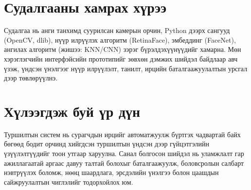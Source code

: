 \section{Судалгааны хамрах хүрээ}
Судалгаа нь анги танхимд суурилсан камерын орчин, Python дээрх сангууд (OpenCV, dlib), нүүр илрүүлэх алгоритм (RetinaFace), эмбеддинг (FaceNet), ангилах алгоритм (жишээ: KNN/CNN) зэрэг бүрэлдэхүүнүүдийг хамарна. Мөн хэрэглэгчийн интерфэйсийн прототипийг зөвхөн дэмжих шийдэл байдлаар авч үзэж, үндсэн үнэлгээг нүүр илрүүлэлт, танилт, ирцийн баталгаажуулалтын урсгал дээр төвлөрүүлнэ.

\section{Хүлээгдэж буй үр дүн}
Туршилтын систем нь сурагчдын ирцийг автоматжуулж бүртгэх чадвартай байх бөгөөд бодит орчинд хийгдсэн туршилтын үндсэн дээр гүйцэтгэлийн үзүүлэлтүүдийг тоон утгаар харуулна. Санал болгосон шийдэл нь уламжлалт гар ажиллагаатай аргаас давуу талтай болохыг баталгаажуулж, боловсролын салбарт нэвтрүүлэх боломж, нөөц шаардлага, эрсдэлийн үнэлгээ болон цаашдын сайжруулалтын чиглэлийг тодорхойлох юм.
